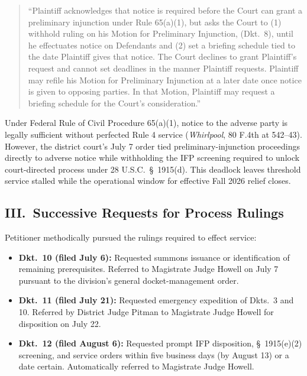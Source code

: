 \documentclass[14pt]{extarticle}
\begin{document}
\begin{quote}
``Plaintiff acknowledges that notice is required before the Court can grant a preliminary injunction under Rule 65(a)(1), but asks the Court to (1) withhold ruling on his Motion for Preliminary Injunction, (Dkt.\ 8), until he effectuates notice on Defendants and (2) set a briefing schedule tied to the date Plaintiff gives that notice. The Court declines to grant Plaintiff's request and cannot set deadlines in the manner Plaintiff requests. Plaintiff may refile his Motion for Preliminary Injunction at a later date once notice is given to opposing parties. In that Motion, Plaintiff may request a briefing schedule for the Court's consideration.''
\end{quote}

Under Federal Rule of Civil Procedure 65(a)(1), notice to the adverse party is legally sufficient without perfected Rule 4 service (\textit{Whirlpool}, 80 F.4th at 542--43). However, the district court's July 7 order tied preliminary-injunction proceedings directly to adverse notice while withholding the IFP screening required to unlock court-directed process under 28 U.S.C.\ \S\ 1915(d). This deadlock leaves threshold service stalled while the operational window for effective Fall 2026 relief closes.

\subsection*{III.\ Successive Requests for Process Rulings}

Petitioner methodically pursued the rulings required to effect service:

\begin{itemize}
\item \textbf{Dkt.\ 10 (filed July 6):} Requested summons issuance or identification of remaining prerequisites. Referred to Magistrate Judge Howell on July 7 pursuant to the division's general docket-management order.
\item \textbf{Dkt.\ 11 (filed July 21):} Requested emergency expedition of Dkts.\ 3 and 10. Referred by District Judge Pitman to Magistrate Judge Howell for disposition on July 22.
\item \textbf{Dkt.\ 12 (filed August 6):} Requested prompt IFP disposition, \S\ 1915(e)(2) screening, and service orders within five business days (by August 13) or a date certain. Automatically referred to Magistrate Judge Howell.
\end{itemize}
\end{document}
